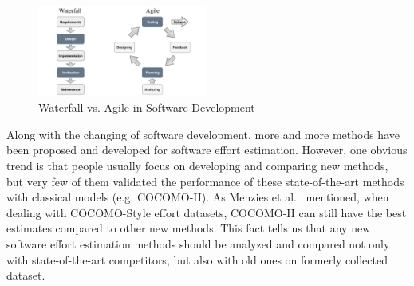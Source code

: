 \documentclass[sigconf,review,anonymous]{acmart}
\begin{document}
\begin{figure}
\centerline{\includegraphics[width=0.5\textwidth]{water_grey.pdf}}
\caption{Waterfall vs. Agile in Software Development}    
\label{fig:water}
\end{figure}



Along with the changing of software development, more and more methods have been proposed and developed for software effort estimation. However,  one obvious trend is that people usually focus on developing and comparing new methods, but very few of them validated the performance of these state-of-the-art methods with classical models (e.g. COCOMO-II). As Menzies et al.~\cite{MenziesNeg:2017} mentioned, when dealing with COCOMO-Style effort datasets, COCOMO-II can still have the best estimates compared to other new methods. This fact tells us that any new software effort estimation methods should be analyzed and compared not only with state-of-the-art competitors, but also with old ones on formerly collected dataset. 


\end{document}
